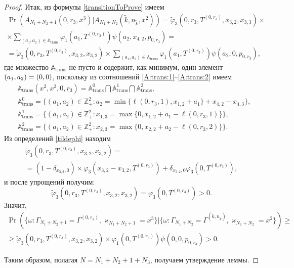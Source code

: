 \begin{proof}
Итак,  из формулы \eqref{transitionToProve} имеем
\begin{multline*}
\Pr( A_{N_1+N_2+1} (0,  r_3,  x^{3})
|A_{N_1+N_2} (\tilde{k},  n_{\tilde{k}},  x^{2}))
=\widetilde{\varphi}_3(0,  r_3,  T^{(0,  r_3)},  x_{3,  2},  x_{3,  3}) \times\\ \times
\sum_{(a_1,  a_2)\in {\mathbb A}_{\mathrm{trans}}}\varphi_1(a_1,  T^{(0,  r_3)})  \psi(a_2,  x_{4,  2},  p_{0,  r_3}) =\\
=\widetilde{\varphi}_3(0,  r_3,  T^{(0,  r_3)},  x_{3,  2},  x_{3,  2}) \times
\sum_{(a_1,  a_2)\in {\mathbb A}_{\mathrm{trans}}}\varphi_1(a_1, T^{(0, r_3)})  \psi(a_2,  0,  p_{0,  r_3}), 
\end{multline*}
где множество ${\mathbb A}_{\mathrm{trans}}$ не пусто и содержит,  как минимум,  один элемент $(a_1,  a_2)\hm=(0,  0)$,  поскольку из соотношений \eqref{A:trans:1}--\eqref{A:trans:2} имеем
\begin{align*}
&{\mathbb A}_{\mathrm{trans}}(x^2,  x^{3},  0,  r_3) = {\mathbb A}_{\mathrm{trans}}^0 \bigcap {\mathbb A}_{\mathrm{trans}}^1\bigcap {\mathbb A}_{\mathrm{trans}}^2, \\
&{\mathbb A}_{\mathrm{trans}}^0 = \{(a_1,  a_2) \in \mathbb{Z}_+^2 \colon a_2 = \min{\{\ell(0,  r_3,  1),  x_{1,  2}+a_1}\} +x_{4,  2}- x_{4,  3}\}, \\
&{\mathbb A}_{\mathrm{trans}}^1 = \{(a_1,  a_2) \in \mathbb{Z}_+^2 \colon x_{1,  3}=\max{\{0,  x_{1,  2}+a_1-\ell(0,  r_3,  1)\}}\}, \\
& {\mathbb A}_{\mathrm{trans}}^2 = \{(a_1,  a_2) \in \mathbb{Z}_+^2 \colon  x_{2,  3} =\max{\{0,  x_{2,  2}+a_2-\ell(0,  r_3,  2)\}}\}. 
\end{align*}
Из определений \eqref{tildephi} находим
\begin{multline*}
\widetilde{\varphi}_3(0,  r_3,  T^{(0,  r_3)},  x_{3,  2}, x_{3,  2})=\\
= (1-\delta_{x_{3,  2},  0}) \times \varphi_3(x_{3,  2} - x_{3,  2},  T^{(0,  r_3)} ) 
+\delta_{x_{3,  2},  0} \varphi_3 (0,  T^{(0,  r_3)}),
\end{multline*}
и после упрощений получим:
\begin{equation*}
\widetilde{\varphi}_3(0,  r_3,  T^{(0,  r_3)},  x_{3,  2},  x_{3,  2})=\varphi_3(0,  T^{(0,  r_3)} ) >0.
\end{equation*}
Значит, 
\begin{multline*}
\!\!\Pr(\{\omega\colon\!\! \Gamma_{N_1+N_2+1}=\Gamma^{(0,  r_3)},  \varkappa_{N_1+N_2+1}=x^{3}\}|\{\omega\colon\!
\Gamma_{N_1+N_2}=\Gamma^{(\tilde{k},  n_{\tilde{k}})},  \varkappa_{N_1+N_2}\!=\!x^2\})\geqslant \\
\geqslant \widetilde{\varphi}_3(0,  r_3,  T^{(0,  r_3)},  x_{3,  2},  x_{3,  2})
\times
\varphi_1(0,  T^{(0,  r_3)})  \psi(0,  0,  p_{0,  r_3}) > 0.
\end{multline*}

Таким образом,  полагая $N=N_1+N_2+1+N_3$,  получаем утверждение леммы.
\end{proof}

